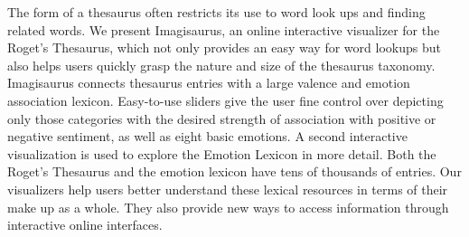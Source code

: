 The form of a thesaurus often restricts its use to word look ups and finding related words. We present Imagisaurus, an online interactive visualizer for the Roget's Thesaurus, which not only provides an easy way for word lookups but also helps users quickly grasp the nature and size of the thesaurus taxonomy. Imagisaurus connects thesaurus entries with a large valence and emotion association lexicon.  Easy-to-use sliders give the user fine control over depicting only those categories with the desired strength of association with positive or negative sentiment, as well as eight basic emotions.  A second interactive visualization is used to explore the Emotion Lexicon in more detail.  Both the Roget's Thesaurus and the emotion lexicon have tens of thousands of entries.  Our visualizers help users better understand these lexical resources in terms of their make up as a whole. They also provide new ways to access information through interactive online interfaces.
